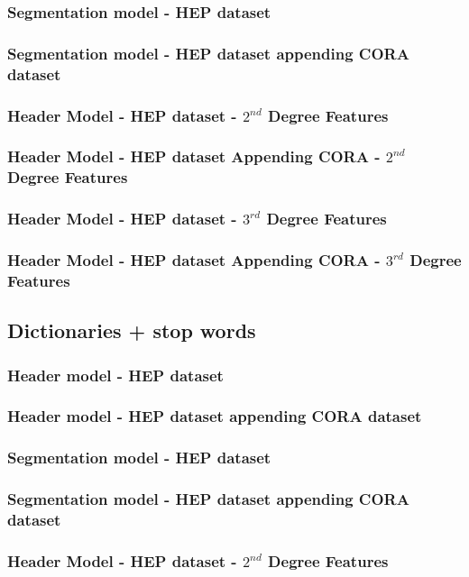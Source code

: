 \documentclass[10pt, oneside]{scrartcl}   	%
\begin{document}
\subsubsection{Segmentation model - HEP dataset}
\subsubsection{Segmentation model - HEP dataset appending CORA dataset}
\subsubsection{Header Model - HEP dataset - $2^{nd}$ Degree Features}
\subsubsection{Header Model - HEP dataset Appending CORA - $2^{nd}$ Degree Features}
\subsubsection{Header Model - HEP dataset - $3^{rd}$ Degree Features}
\subsubsection{Header Model - HEP dataset Appending CORA - $3^{rd}$ Degree Features}
\subsection{Dictionaries + stop words}
\subsubsection{Header model - HEP dataset}
\subsubsection{Header model - HEP dataset appending CORA dataset}
\subsubsection{Segmentation model - HEP dataset}
\subsubsection{Segmentation model - HEP dataset appending CORA dataset}
\subsubsection{Header Model - HEP dataset - $2^{nd}$ Degree Features}
\end{document}
